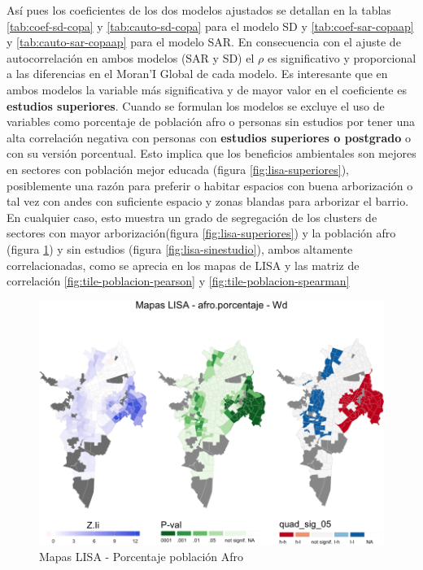 \documentclass[12pt,]{book}
\begin{document}
Así pues los coeficientes de los dos modelos ajustados se detallan en la
tablas \ref{tab:coef-sd-copa} y \ref{tab:cauto-sd-copa} para el modelo
SD y \ref{tab:coef-sar-copaap} y \ref{tab:cauto-sar-copaap} para el
modelo SAR. En consecuencia con el ajuste de autocorrelación en ambos
modelos (SAR y SD) el \(\rho\) es significativo y proporcional a las
diferencias en el Moran'I Global de cada modelo. Es interesante que en
ambos modelos la variable más significativa y de mayor valor en el
coeficiente es \textbf{estudios superiores}. Cuando se formulan los
modelos se excluye el uso de variables como porcentaje de población afro
o personas sin estudios por tener una alta correlación negativa con
personas con \textbf{estudios superiores o postgrado} o con su versión
porcentual. Esto implica que los beneficios ambientales son mejores en
sectores con población mejor educada (figura \ref{fig:lisa-superiores}),
posiblemente una razón para preferir o habitar espacios con buena
arborización o tal vez con andes con suficiente espacio y zonas blandas
para arborizar el barrio. En cualquier caso, esto muestra un grado de
segregación de los clusters de sectores con mayor arborización(figura
\ref{fig:lisa-superiores}) y la población afro (figura
\ref{fig:lisa-afro}) y sin estudios (figura \ref{fig:lisa-sinestudio}),
ambos altamente correlacionadas, como se aprecia en los mapas de LISA y
las matriz de correlación \ref{fig:tile-poblacion-pearson} y
\ref{fig:tile-poblacion-spearman}

\begin{figure}
\includegraphics[width=1\linewidth]{tesis-unigis_files/figure-latex/lisa-afro-1} \caption{Mapas LISA - Porcentaje población Afro}\label{fig:lisa-afro}
\end{figure}
\end{document}

